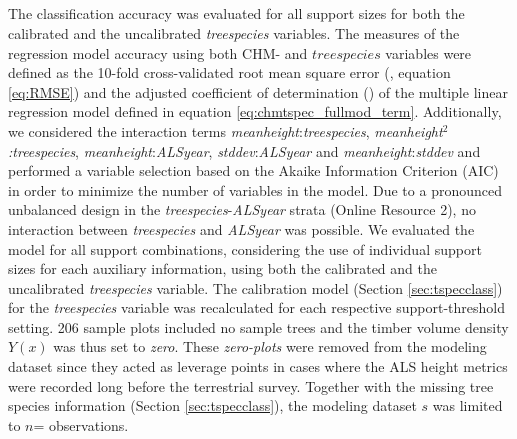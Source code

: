 \subsection{}
\label{sec:modval}

 The classification accuracy was evaluated for all support sizes for both the calibrated and the uncalibrated \textit{treespecies} variables. The measures of the regression model accuracy using both CHM- and $treespecies$ variables were defined as the 10-fold cross-validated root mean square error (\rmsecv{}, equation \ref{eq:RMSE}) and the adjusted coefficient of determination (\adjrsq{}) of the multiple linear regression model defined in equation \ref{eq:chmtspec_fullmod_term}. Additionally, we considered the interaction terms \textit{meanheight}:\textit{treespecies}, \textit{meanheight$^{2}$:treespecies}, \textit{meanheight}:\textit{ALSyear}, \textit{stddev}:\textit{ALSyear} and \textit{meanheight}:\textit{stddev} and performed a variable selection based on the Akaike Information Criterion (AIC) \citep{Akaike2011} in order to minimize the number of variables in the model. Due to a pronounced unbalanced design in the \textit{treespecies}-\textit{ALSyear} strata (Online Resource 2), no interaction between \textit{treespecies} and \textit{ALSyear} was possible. We evaluated the model for all support combinations, considering the use of individual support sizes for each auxiliary information, using both the calibrated and the uncalibrated \textit{treespecies} variable. The calibration model (Section \ref{sec:tspecclass}) for the \textit{treespecies} variable was recalculated for each respective support-threshold setting. 206 sample plots included no sample trees and the timber volume density $Y(x)$ was thus set to \textit{zero}. These \textit{zero-plots} were removed from the modeling dataset since they acted as leverage points in cases where the ALS height metrics were recorded long before the terrestrial survey. Together with the missing tree species information (Section \ref{sec:tspecclass}), the modeling dataset $s$ was limited to $n$= observations.

